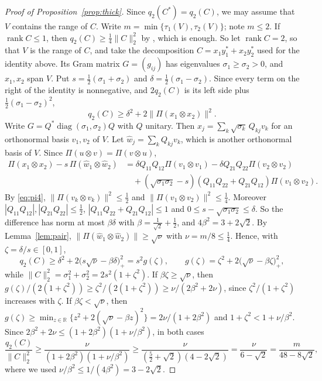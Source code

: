 \documentclass[11pt]{article}
\theoremstyle{remark}
\newcommand{\norm}[1]{\lVert #1\rVert}
\begin{document}
\begin{proof}[Proof of Proposition~\ref{prop:thick}]
Since $q_2(C^*)=q_2(C)$, we may assume that $V$ contains the range of $C$. Write $m=\min\{\tau_1(V),\tau_2(V)\}$; note
$m\le2$. If $\operatorname{rank}C\le1$, then $q_2(C)\ge\frac14\norm{C}_2^2$ by \cite[Prop.~8]{SongChen}, which is
enough. So let
$\operatorname{rank}C=2$, so that $V$ is the range of $C$, and take the decomposition $C=x_1y_1^*+x_2y_2^*$ used for
the identity above. Its Gram matrix $G=(g_{ij})$ has eigenvalues $\sigma_1\ge\sigma_2>0$, and $x_1,x_2$ span $V$. Put
$s=\frac12(\sigma_1+\sigma_2)$ and $\delta=\frac12(\sigma_1-\sigma_2)$. Since every term on the right of the identity is
nonnegative, and $2q_2(C)$ is its left side plus $\frac12(\sigma_1-\sigma_2)^2$,
\[
q_2(C)\ge\delta^2+2\norm{\Pi(x_1\otimes x_2)}^2 .
\]
Write $G=Q^*\operatorname{diag}(\sigma_1,\sigma_2)Q$ with $Q$ unitary. Then
$x_j=\sum_k\sqrt{\sigma_k}\,Q_{kj}v_k$ for an orthonormal basis $v_1,v_2$ of $V$. Let $\hat w_j=\sum_kQ_{kj}v_k$, which
is another orthonormal basis of $V$. Since $\Pi(u\otimes v)=\Pi(v\otimes u)$,
\begin{align*}
\Pi(x_1\otimes x_2)-s\,\Pi(\hat w_1\otimes\hat w_2)
&=\delta Q_{11}Q_{12}\Pi(v_1\otimes v_1)-\delta Q_{21}Q_{22}\Pi(v_2\otimes v_2)\\
&\quad+(\sqrt{\sigma_1\sigma_2}-s)(Q_{11}Q_{22}+Q_{21}Q_{12})\Pi(v_1\otimes v_2).
\end{align*}
By \eqref{eq:pi4}, $\norm{\Pi(v_k\otimes v_k)}^2\le\frac12$ and $\norm{\Pi(v_1\otimes v_2)}^2\le\frac14$. Moreover
$|Q_{11}Q_{12}|,|Q_{21}Q_{22}|\le\frac12$, $|Q_{11}Q_{22}+Q_{21}Q_{12}|\le1$ and $0\le s-\sqrt{\sigma_1\sigma_2}\le\delta$.
So the difference has norm at most $\beta\delta$ with $\beta=\frac1{\sqrt2}+\frac12$, and $4\beta^2=3+2\sqrt2$. By
Lemma~\ref{lem:pair}, $\norm{\Pi(\hat w_1\otimes\hat w_2)}\ge\sqrt\nu$ with $\nu=m/8\le\frac14$. Hence, with
$\zeta=\delta/s\in[0,1]$,
\[
q_2(C)\ge\delta^2+2\big(s\sqrt\nu-\beta\delta\big)_+^2=s^2g(\zeta),\qquad g(\zeta)=\zeta^2+2\big(\sqrt\nu-\beta\zeta\big)_+^2,
\]
while $\norm{C}_2^2=\sigma_1^2+\sigma_2^2=2s^2(1+\zeta^2)$. If $\beta\zeta\ge\sqrt\nu$, then
$g(\zeta)/(2(1+\zeta^2))\ge\zeta^2/(2(1+\zeta^2))\ge\nu/(2\beta^2+2\nu)$, since $\zeta^2/(1+\zeta^2)$ increases with
$\zeta$. If $\beta\zeta<\sqrt\nu$, then $g(\zeta)\ge\min_{z\in\mathbb R}\{z^2+2(\sqrt\nu-\beta z)^2\}=2\nu/(1+2\beta^2)$
and $1+\zeta^2<1+\nu/\beta^2$. Since $2\beta^2+2\nu\le(1+2\beta^2)(1+\nu/\beta^2)$, in both cases
\[
\frac{q_2(C)}{\norm{C}_2^2}\ge\frac{\nu}{(1+2\beta^2)(1+\nu/\beta^2)}
\ge\frac{\nu}{(\frac52+\sqrt2)(4-2\sqrt2)}=\frac{\nu}{6-\sqrt2}=\frac{m}{48-8\sqrt2},
\]
where we used $\nu/\beta^2\le1/(4\beta^2)=3-2\sqrt2$.
\end{proof}
\end{document}
